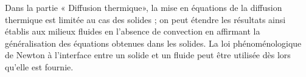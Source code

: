 \vspace{0.25cm}
Dans la partie « Diffusion thermique», la mise en équations de la diffusion thermique est limitée au cas des solides ; on peut étendre les résultats ainsi établis aux milieux fluides en l'absence de convection en affirmant la généralisation des équations obtenues dans les solides. La loi phénoménologique de Newton à l'interface entre un solide et un fluide peut être utilisée dès lors qu'elle est fournie.
